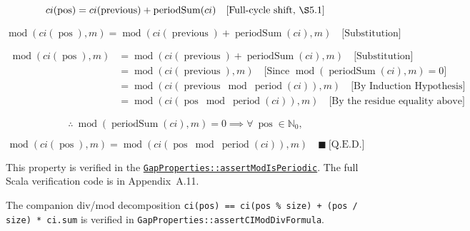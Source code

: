 \begin{equation*}
ci(\operatorname{pos}) = ci(\operatorname{previous}) + \operatorname{periodSum}(ci)
  \quad \text{[Full-cycle shift, \S5.1]}
\end{equation*}

\begin{equation*}
\operatorname{mod}(ci(\operatorname{pos}), m) = \operatorname{mod}(ci(\operatorname{previous}) + \operatorname{periodSum}(ci), m)
  \quad \text{[Substitution]}
\end{equation*}

\begin{equation*}
\begin{aligned}
\operatorname{mod}(ci(\operatorname{pos}), m) &= \operatorname{mod}(ci(\operatorname{previous}) + \operatorname{periodSum}(ci), m)
  \quad \text{[Substitution]} \\
&= \operatorname{mod}(ci(\operatorname{previous}), m)
  \quad \text{[Since } \operatorname{mod}(\operatorname{periodSum}(ci), m) = 0 \text{]} \\
&= \operatorname{mod}(ci(\operatorname{previous} \bmod \operatorname{period}(ci)), m)
  \quad \text{[By Induction Hypothesis]} \\
&= \operatorname{mod}(ci(\operatorname{pos} \bmod \operatorname{period}(ci)), m)
  \quad \text{[By the residue equality above]}
\end{aligned}
\end{equation*}

\begin{equation*}
\therefore \ \operatorname{mod}(\operatorname{periodSum}(ci), m) = 0 \implies \forall \ \operatorname{pos} \in \mathbb{N}_0,
\end{equation*}

\begin{equation*}
\operatorname{mod}(ci(\operatorname{pos}), m) = \operatorname{mod}(ci(\operatorname{pos} \bmod \operatorname{period}(ci)), m) \quad \blacksquare\ \text{[Q.E.D.]}
\end{equation*}

{\raggedright
This property is verified in the
\href{https://github.com/thiagomata/prime-numbers/blob/integral-cycle-article-v1.0.0/src/main/scala/v1/chapter4/cycle/integral/recursive/properties/GapProperties.scala}{\texttt{GapProperties::\allowbreak assertModIsPeriodic}}.
The full Scala verification code is in Appendix~A.11.
\par}

{\raggedright
The companion div/mod decomposition
\texttt{ci(pos) == ci(pos \% size) + (pos / size) * ci.sum}
is verified in
\texttt{GapProperties::\allowbreak assertCIModDivFormula}.
\par}

